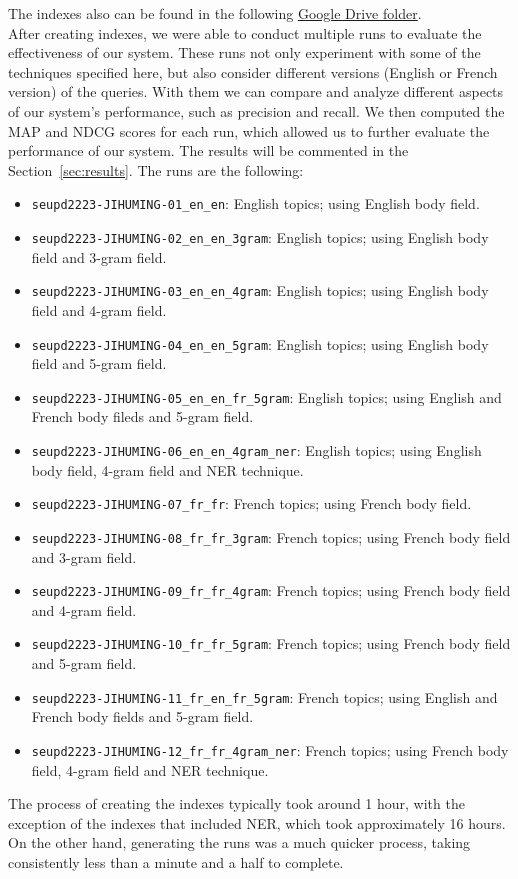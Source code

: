 The indexes also can be found in the following
\href{https://drive.google.com/drive/folders/1CK_kLeZ5Us3VJe8hiG1vhwPrDs94cLvU?usp=share_link}{Google Drive folder}.\\

After creating indexes, we were able to conduct multiple runs to evaluate the effectiveness of our system.
These runs not only experiment with some of the techniques specified here, but also consider different versions (English
or French version) of the queries.
With them we can compare and analyze different aspects of our system's performance, such as precision and recall.
We then computed the MAP and NDCG scores for each run, which allowed us to further evaluate the performance of our 
system.
The results will be commented in the Section~\ref{sec:results}.
The runs are the following:
\begin{itemize}
	\item \texttt{seupd2223-JIHUMING-01\_en\_en}: English topics; using English body field.
	\item \texttt{seupd2223-JIHUMING-02\_en\_en\_3gram}: English topics; using English body field and 3-gram field.
	\item \texttt{seupd2223-JIHUMING-03\_en\_en\_4gram}: English topics; using English body field and 4-gram field.
	\item \texttt{seupd2223-JIHUMING-04\_en\_en\_5gram}: English topics; using English body field and 5-gram field.
	\item \texttt{seupd2223-JIHUMING-05\_en\_en\_fr\_5gram}: English topics; using English and French body fileds and 5-gram field.
	\item \texttt{seupd2223-JIHUMING-06\_en\_en\_4gram\_ner}: English topics; using English body field, 4-gram field and NER technique.
	\item \texttt{seupd2223-JIHUMING-07\_fr\_fr}: French topics; using French body field.
	\item \texttt{seupd2223-JIHUMING-08\_fr\_fr\_3gram}: French topics; using French body field and 3-gram field.
	\item \texttt{seupd2223-JIHUMING-09\_fr\_fr\_4gram}: French topics; using French body field and 4-gram field.
	\item \texttt{seupd2223-JIHUMING-10\_fr\_fr\_5gram}: French topics; using French body field and 5-gram field.
	\item \texttt{seupd2223-JIHUMING-11\_fr\_en\_fr\_5gram}: French topics; using English and French body fields and 5-gram field.
	\item \texttt{seupd2223-JIHUMING-12\_fr\_fr\_4gram\_ner}: French topics; using French body field, 4-gram field and NER technique.
\end{itemize}

The process of creating the indexes typically took around 1 hour, with the exception of the indexes that included NER,
which took approximately 16 hours.
On the other hand, generating the runs was a much quicker process, taking consistently less than a minute and a half to
complete.
